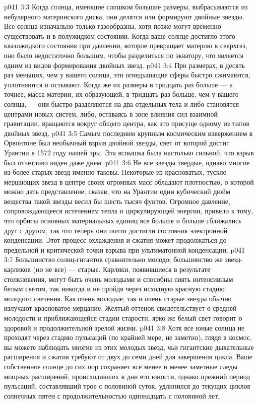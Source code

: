 \vs p041 3:3 \pc Когда солнца, имеющие слишком большие размеры, выбрасываются из небулярного материнского диска, они делятся или формируют двойные звезды. Все солнца изначально только газообразны, хотя позже могут временно существовать и в полужидком состоянии. Когда ваше солнце достигло этого квазижидкого состояния при давлении, которое превращает материю в сверхгаз, оно было недостаточно большим, чтобы разделиться по экватору, что является одним из видов формирования двойных звезд.
\vs p041 3:4 При размерах, в десять раз меньших, чем у вашего солнца, эти огнедышащие сферы быстро сжимаются, уплотняются и остывают. Когда же их размеры в тридцать раз больше --- а точнее, масса материи, их образующей, в тридцать раз больше, чем у вашего солнца, --- они быстро разделяются на два отдельных тела и либо становятся центрами новых систем, либо, оставаясь в зоне влияния сил взаимной гравитации, вращаются вокруг общего центра, как это присуще одному из типов двойных звезд.
\vs p041 3:5 \pc Самым последним крупным космическим извержением в Орвонтоне был необычный взрыв двойной звезды, свет от которой достиг Урантии в 1572 году нашей эры. Эта вспышка была настолько сильной, что взрыв был отчетливо виден даже днем.
\vs p041 3:6 \pc Не все звезды твердые, однако многие из более старых звезд именно таковы. Некоторые из красноватых, тускло мерцающих звезд в центре своих огромных масс обладают плотностью, о которой можно дать представление, сказав, что на Урантии один кубический дюйм вещества такой звезды весил бы шесть тысяч фунтов. Огромное давление, сопровождающееся истечением тепла и циркулирующей энергии, привело к тому, что орбиты основных материальных единиц все больше и больше сближались друг с другом, так что теперь они почти достигли состояния электронной конденсации. Этот процесс охлаждения и сжатия может продолжаться до предельной и критической точки взрыва при ультиматонной конденсации.
\vs p041 3:7 Большинство солнц\hyp{}гигантов сравнительно молодо; большинство же звезд\hyp{}карликов (но не все) --- старые. Карлики, появившиеся в результате столкновения, могут быть очень молодыми и способны сиять интенсивным белым светом, так никогда и не пройдя через исходную красную стадию молодого свечения. Как очень молодые, так и очень старые звезды обычно излучают красноватое мерцание. Желтый оттенок свидетельствует о средней молодости и приближающейся стадии старости, ярко же белый свет говорит о здоровой и продолжительной зрелой жизни.
\vs p041 3:8 \pc Хотя все юные солнца не проходят через стадию пульсаций (по крайней мере, не заметно), глядя в космос, вы можете наблюдать многие из этих молодых звезд, чьи гигантские дыхательные расширения и сжатия требуют от двух до семи дней для завершения цикла. Ваше собственное солнце до сих пор сохраняет все менее и менее заметные следы мощных расширений, происходивших в дни его юности, однако прежний период пульсаций, составлявший трое с половиной суток, удлинился до текущих циклов солнечных пятен с продолжительностью одиннадцать с половиной лет.
